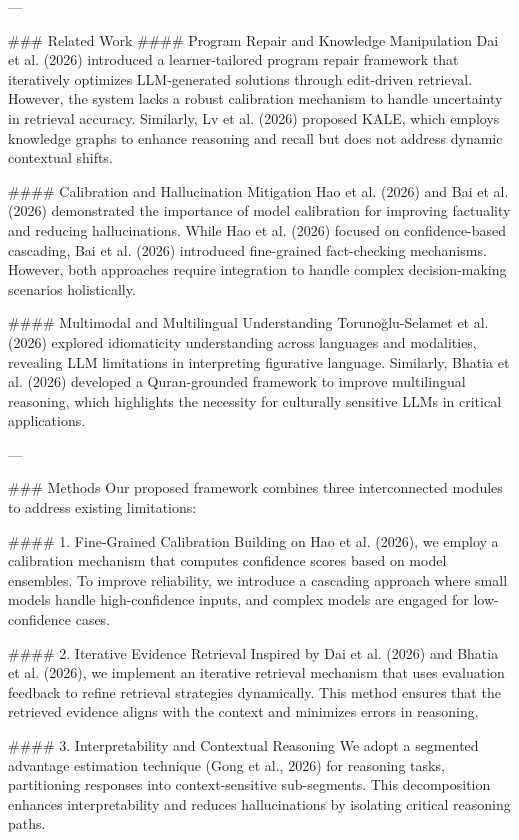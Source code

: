 ---

### Related Work
#### Program Repair and Knowledge Manipulation
Dai et al. (2026) introduced a learner-tailored program repair framework that iteratively optimizes LLM-generated solutions through edit-driven retrieval. However, the system lacks a robust calibration mechanism to handle uncertainty in retrieval accuracy. Similarly, Lv et al. (2026) proposed KALE, which employs knowledge graphs to enhance reasoning and recall but does not address dynamic contextual shifts.

#### Calibration and Hallucination Mitigation
Hao et al. (2026) and Bai et al. (2026) demonstrated the importance of model calibration for improving factuality and reducing hallucinations. While Hao et al. (2026) focused on confidence-based cascading, Bai et al. (2026) introduced fine-grained fact-checking mechanisms. However, both approaches require integration to handle complex decision-making scenarios holistically.

#### Multimodal and Multilingual Understanding
Torunoğlu-Selamet et al. (2026) explored idiomaticity understanding across languages and modalities, revealing LLM limitations in interpreting figurative language. Similarly, Bhatia et al. (2026) developed a Quran-grounded framework to improve multilingual reasoning, which highlights the necessity for culturally sensitive LLMs in critical applications.

---

### Methods
Our proposed framework combines three interconnected modules to address existing limitations:

#### 1. Fine-Grained Calibration
Building on Hao et al. (2026), we employ a calibration mechanism that computes confidence scores based on model ensembles. To improve reliability, we introduce a cascading approach where small models handle high-confidence inputs, and complex models are engaged for low-confidence cases.

#### 2. Iterative Evidence Retrieval
Inspired by Dai et al. (2026) and Bhatia et al. (2026), we implement an iterative retrieval mechanism that uses evaluation feedback to refine retrieval strategies dynamically. This method ensures that the retrieved evidence aligns with the context and minimizes errors in reasoning.

#### 3. Interpretability and Contextual Reasoning
We adopt a segmented advantage estimation technique (Gong et al., 2026) for reasoning tasks, partitioning responses into context-sensitive sub-segments. This decomposition enhances interpretability and reduces hallucinations by isolating critical reasoning paths.

